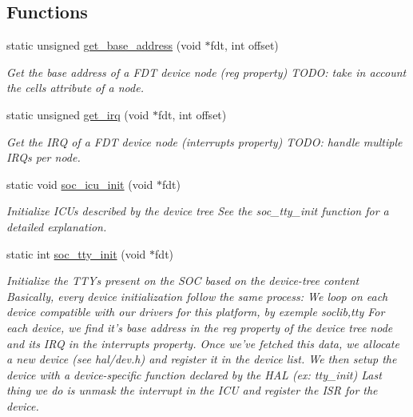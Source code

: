 \subsection*{Functions}
\begin{DoxyCompactItemize}
\item 
static unsigned \hyperlink{almo1-mips_2soc_8c_a8f32c2785fa3edd070abdaa34c96f6a7}{get\-\_\-base\-\_\-address} (void $\ast$fdt, int offset)
\begin{DoxyCompactList}\small\item\em Get the base address of a F\-D\-T device node (reg property) T\-O\-D\-O\-: take in account the cells attribute of a node. \end{DoxyCompactList}\item 
static unsigned \hyperlink{almo1-mips_2soc_8c_a7bd21ef4af7971db5dad06231290d8d1}{get\-\_\-irq} (void $\ast$fdt, int offset)
\begin{DoxyCompactList}\small\item\em Get the I\-R\-Q of a F\-D\-T device node (interrupts property) T\-O\-D\-O\-: handle multiple I\-R\-Qs per node. \end{DoxyCompactList}\item 
static void \hyperlink{almo1-mips_2soc_8c_a4c268c213e6a62adfab96031629fa015}{soc\-\_\-icu\-\_\-init} (void $\ast$fdt)
\begin{DoxyCompactList}\small\item\em Initialize I\-C\-Us described by the device tree See the soc\-\_\-tty\-\_\-init function for a detailed explanation. \end{DoxyCompactList}\item 
static int \hyperlink{almo1-mips_2soc_8c_a05f9476d07e118d280add6f5e3de365b}{soc\-\_\-tty\-\_\-init} (void $\ast$fdt)
\begin{DoxyCompactList}\small\item\em Initialize the T\-T\-Ys present on the S\-O\-C based on the device-\/tree content Basically, every device initialization follow the same process\-: We loop on each device compatible with our drivers for this platform, by exemple soclib,tty For each device, we find it's base address in the reg property of the device tree node and its I\-R\-Q in the interrupts property. Once we've fetched this data, we allocate a new device (see hal/dev.\-h) and register it in the device list. We then setup the device with a device-\/specific function declared by the H\-A\-L (ex\-: tty\-\_\-init) Last thing we do is unmask the interrupt in the I\-C\-U and register the I\-S\-R for the device. \end{DoxyCompactList}\item 

\end{DoxyCompactItemize}
